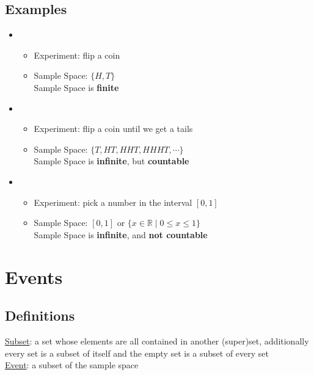 \documentclass[12pt]{article}
\begin{document}
        \subsection{Examples}
            \begin{itemize}
                \item 
                    \begin{itemize}
                        \item Experiment: flip a coin
                        \item Sample Space: $\{H, T\}$
                        \\Sample Space is \textbf{finite}
                    \end{itemize}
                \item 
                    \begin{itemize}
                        \item Experiment: flip a coin until we get a tails
                        \item Sample Space: $\{T, HT, HHT, HHHT, \cdots\}$
                        \\Sample Space is \textbf{infinite}, but \textbf{countable}
                    \end{itemize}
                \item 
                    \begin{itemize}
                        \item Experiment: pick a number in the interval $[0, 1]$
                        \item Sample Space: $[0, 1]$ or $\{ x \in \mathbb{R} \mid 0 \leq x \leq 1 \}$
                        \\Sample Space is \textbf{infinite}, and \textbf{not countable}
                    \end{itemize}
            \end{itemize}
        
    \section{Events}
        \subsection{Definitions}
            \underline{Subset}: a set whose elements are all contained in another (super)set, additionally every set is a subset of itself and the empty set is a subset of every set
            \\\underline{Event}: a subset of the sample space
\end{document}

